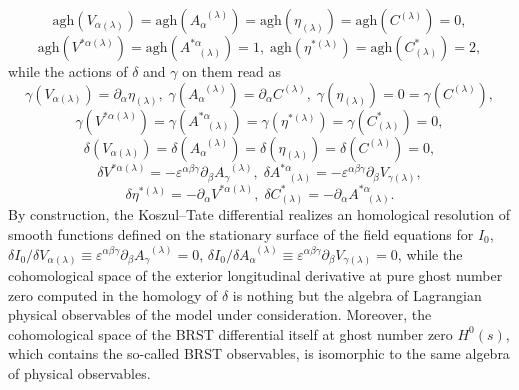 \documentclass[a4paper,11pt]{article}
\begin{document}
\begin{equation}
\mathrm{agh}\left( V_{\alpha (\lambda )}\right) =\mathrm{agh}\left(
A_{\alpha }^{\;\;(\lambda )}\right) =\mathrm{agh}\left( \eta _{(\lambda
)}\right) =\mathrm{agh}\left( C^{(\lambda )}\right) =0,  \label{bf41}
\end{equation}
\begin{equation}
\mathrm{agh}\left( V^{*\alpha (\lambda )}\right) =\mathrm{agh}\left(
A_{\;\;\;(\lambda )}^{*\alpha }\right) =1,\;\mathrm{agh}\left( \eta
^{*(\lambda )}\right) =\mathrm{agh}\left( C_{(\lambda )}^{*}\right) =2,
\label{bf42}
\end{equation}
while the actions of $\delta $ and $\gamma $ on them read as
\begin{equation}
\gamma \left( V_{\alpha (\lambda )}\right) =\partial _{\alpha }\eta
_{(\lambda )},\;\gamma \left( A_{\alpha }^{\;\;(\lambda )}\right) =\partial
_{\alpha }C^{(\lambda )},\;\gamma \left( \eta _{(\lambda )}\right) =0=\gamma
\left( C^{(\lambda )}\right) ,  \label{bf43}
\end{equation}
\begin{equation}
\gamma \left( V^{*\alpha (\lambda )}\right) =\gamma \left( A_{\;\;\;(\lambda
)}^{*\alpha }\right) =\gamma \left( \eta ^{*(\lambda )}\right) =\gamma
\left( C_{(\lambda )}^{*}\right) =0,  \label{bf44}
\end{equation}
\begin{equation}
\delta \left( V_{\alpha (\lambda )}\right) =\delta \left( A_{\alpha
}^{\;\;(\lambda )}\right) =\delta \left( \eta _{(\lambda )}\right) =\delta
\left( C^{(\lambda )}\right) =0,  \label{bf45}
\end{equation}
\begin{equation}
\delta V^{*\alpha (\lambda )}=-\varepsilon ^{\alpha \beta \gamma }\partial
_{\beta }A_{\gamma }^{\;\;(\lambda )},\;\delta A_{\;\;\;(\lambda )}^{*\alpha
}=-\varepsilon ^{\alpha \beta \gamma }\partial _{\beta }V_{\gamma (\lambda
)},  \label{bf46}
\end{equation}
\begin{equation}
\delta \eta ^{*(\lambda )}=-\partial _{\alpha }V^{*\alpha (\lambda
)},\;\delta C_{(\lambda )}^{*}=-\partial _{\alpha }A_{\;\;\;(\lambda
)}^{*\alpha }.  \label{bf47}
\end{equation}
By construction, the Koszul--Tate differential realizes an homological
resolution of smooth functions defined on the stationary surface of the
field equations for $I_{0}$, $\delta I_{0}/\delta V_{\alpha (\lambda
)}\equiv \varepsilon ^{\alpha \beta \gamma }\partial _{\beta }A_{\gamma
}^{\;\;(\lambda )}=0$, $\delta I_{0}/\delta A_{\alpha }^{\;\;(\lambda
)}\equiv \varepsilon ^{\alpha \beta \gamma }\partial _{\beta }V_{\gamma
(\lambda )}=0$, while the cohomological space of the exterior longitudinal
derivative at pure ghost number zero computed in the homology of $\delta $
is nothing but the algebra of Lagrangian physical observables of the model
under consideration. Moreover, the cohomological space of the BRST
differential itself at ghost number zero $H^{0}\left( s\right) $, which
contains the so-called BRST observables, is isomorphic to the same algebra
of physical observables.
\end{document}
